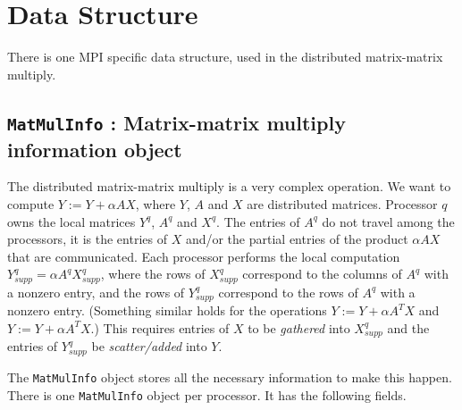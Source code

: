 \par
\section{Data Structure}
\label{section:MPI:dataStructure}
\par
There is one MPI specific data structure, used in the distributed
matrix-matrix multiply.
\par
\subsection{{\tt MatMulInfo} : 
            Matrix-matrix multiply information object}
\label{subsection:MatMulInfo}
\par
The distributed matrix-matrix multiply is a very complex operation.
We want to compute $Y := Y + \alpha A X$, where $Y$, $A$ and $X$
are distributed matrices.
Processor $q$ owns the local matrices $Y^q$, $A^q$ and $X^q$.
The entries of $A^q$ do not travel among the processors, it is the
entries of $X$ and/or the partial entries of the product $\alpha A X$
that are communicated.
Each processor performs the local computation
$Y_{supp}^q = \alpha A^q X_{supp}^q$,
where the rows of $X_{supp}^q$ correspond to the columns of $A^q$
with a nonzero entry,
and the rows of $Y_{supp}^q$ correspond to the rows of $A^q$
with a nonzero entry.
(Something similar holds for the operations
$Y := Y + \alpha A^T X$ and $Y := Y + \alpha A^T X$.)
This requires entries of $X$ to be {\it gathered} into $X_{supp}^q$
and the entries of $Y_{supp}^q$ be {\it scatter/added} into $Y$.
\par
The {\tt MatMulInfo} object stores all the necessary information to
make this happen.
There is one {\tt MatMulInfo} object per processor.
It has the following fields.
